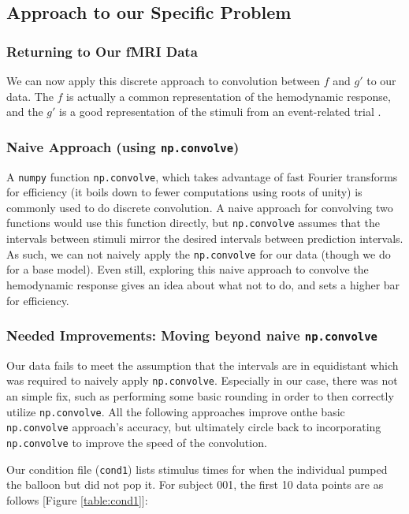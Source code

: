 \subsection{Approach to our Specific Problem}

\subsubsection{Returning to Our fMRI Data}

We can now apply this discrete approach to convolution between $f$ and $g'$ 
to our data. The $f$ is actually a common representation of the hemodynamic 
response, and the $g'$ is a good representation of the stimuli from an 
event-related trial \cite{brett2015course}. 

\subsubsection{Naive Approach (using \texttt{np.convolve})}

A \texttt{numpy} function \texttt{np.convolve}, which takes advantage of 
fast Fourier transforms for efficiency (it boils down to fewer computations 
using roots of unity) is commonly used to do discrete convolution. A naive 
approach for convolving two functions would use this function directly, but
\texttt{np.convolve} assumes that the intervals between stimuli mirror the 
desired intervals between prediction intervals. As such, we can not naively
apply the \texttt{np.convolve} for our data (though we do for a base model). 
Even still, exploring this naive approach to convolve the hemodynamic response 
gives an idea about what not to do, and sets a higher bar for efficiency.

\subsubsection{Needed Improvements: Moving beyond naive \texttt{np.convolve}}

Our data fails to meet the assumption that the intervals are in equidistant 
which was required to naively apply \texttt{np.convolve}. Especially in our 
case, there was not an simple fix, such as performing some basic rounding in 
order to then correctly utilize \texttt{np.convolve}. All the following 
approaches improve onthe basic \texttt{np.convolve} approach's accuracy, but 
ultimately circle back to incorporating \texttt{np.convolve} to improve the 
speed of the convolution.

Our condition file (\texttt{cond1}) lists stimulus times for when the 
individual pumped the balloon but did not pop it. For subject 001, the 
first 10 data points are as follows [Figure \ref{table:cond1}]:

